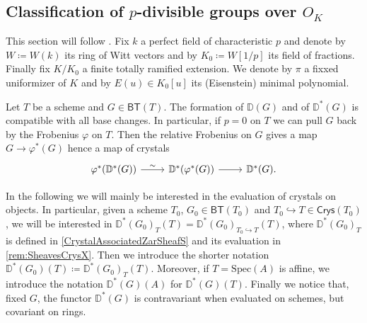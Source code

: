 


\subsection{Classification of \texorpdfstring{$p$}{p}-divisible groups
	over \texorpdfstring{$O_{ K }$}{the ring of integers of K}}
This section will follow \cite[Appendix A]{Kisin}.
Fix $k$ a perfect field of characteristic $p$ and denote by
$W \coloneqq W(k)$ its ring of Witt vectors and by $K_0 \coloneqq W[1/p]$
its field of fractions.
Finally fix $K/K_0$ a finite totally ramified extension.
We denote by $\pi$ a fixxed uniformizer of $K$ and by $E(u) \in K_0[u]$
its (Eisenstein) minimal polynomial.


\begin{rem}[]
	Let $T$ be a scheme and $G \in \mathsf{BT}(T)$.
	The formation of $\mathbb{D}(G)$ and of $\mathbb{D}^*(G)$ is compatible
	with all base changes. %
	In particular, if $p = 0$ on $T$ we can pull $G$ back by the Frobenius $\varphi$ on $T$.
	Then the relative Frobenius on $G$ gives a map $G \to \varphi^*(G)$
	hence a map of crystals
	\begin{equation*}
	\begin{tikzcd}
		\varphi^* (\mathbb{D}^*(G)) \arrow[r, "\sim", rightarrow] &
		\mathbb{D}^*(\varphi^*(G)) \arrow[r, "", rightarrow] &
		\mathbb{D}^*(G)
	.\end{tikzcd}
	\end{equation*}
\end{rem}


\begin{ntt}[]
	In the following we will mainly be interested in the evaluation of
	crystals on objects.
	In particular, given a scheme $T_0$, $G_0 \in \mathsf{BT}(T_0)$ and 
	$T_0 \hookrightarrow T \in \mathsf{Crys}(T_0)$, we will be interested
	in $\mathbb{D}^*(G_0)_{T}(T) = \mathbb{D}^*(G_0)_{T_0 \hookrightarrow T}(T)$,
	where $\mathbb{D}^*(G_0)_T$ is defined in \cref{CrystalAssociatedZarSheafS}
	and its evaluation in \cref{rem:SheavesCrysX}.
	Then we introduce the shorter notation
	$\mathbb{D}^*(G_0)(T) \coloneqq \mathbb{D}^*(G_0)_T(T)$.
	Moreover, if $T = \mathrm{Spec}(A)$ is affine, we introduce the notation
	$\mathbb{D}^*(G)(A)$ for $\mathbb{D}^*(G)(T)$.
	Finally we notice that, fixed $G$, the functor $\mathbb{D}^*(G)$
	is contravariant when evaluated on schemes, but covariant on rings.
\end{ntt}


